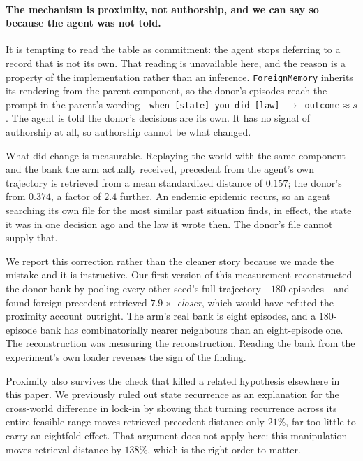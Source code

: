 \documentclass[11pt]{article}
\begin{document}
\paragraph{The mechanism is proximity, not authorship, and we can say so because the agent was not
told.} It is tempting to read the table as commitment: the agent stops deferring to a record that is
not its own. That reading is unavailable here, and the reason is a property of the implementation
rather than an inference. \texttt{ForeignMemory} inherits its rendering from the parent component, so
the donor's episodes reach the prompt in the parent's wording---\texttt{when [state] you did
[law] $\to$ outcome$\approx$}$s$. The agent is told the donor's decisions are its own. It has no
signal of authorship at all, so authorship cannot be what changed.

What did change is measurable. Replaying the world with the same component and the bank the arm
actually received, precedent from the agent's own trajectory is retrieved from a mean standardized
distance of $0.157$; the donor's from $0.374$, a factor of $2.4$ further. An endemic epidemic recurs,
so an agent searching its own file for the most similar past situation finds, in effect, the state it
was in one decision ago and the law it wrote then. The donor's file cannot supply that.

We report this correction rather than the cleaner story because we made the mistake and it is
instructive. Our first version of this measurement reconstructed the donor bank by pooling every
other seed's full trajectory---$180$ episodes---and found foreign precedent retrieved $7.9\times$
\emph{closer}, which would have refuted the proximity account outright. The arm's real bank is eight
episodes, and a $180$-episode bank has combinatorially nearer neighbours than an eight-episode one.
The reconstruction was measuring the reconstruction. Reading the bank from the experiment's own
loader reverses the sign of the finding.

Proximity also survives the check that killed a related hypothesis elsewhere in this paper. We
previously ruled out state recurrence as an explanation for the cross-world difference in lock-in by
showing that turning recurrence across its entire feasible range moves retrieved-precedent distance
only $21\%$, far too little to carry an eightfold effect. That argument does not apply here: this
manipulation moves retrieval distance by $138\%$, which is the right order to matter.
\end{document}
